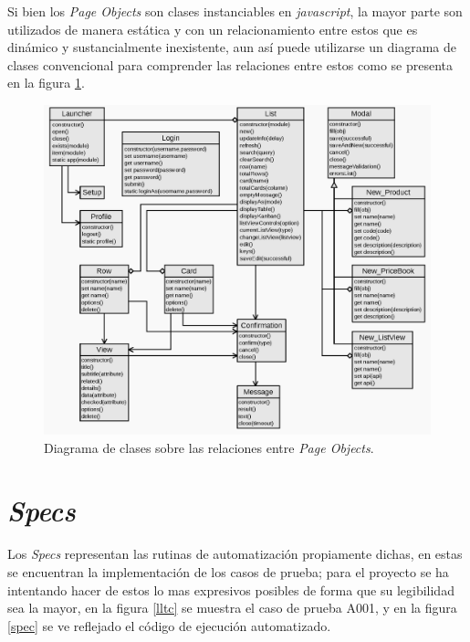 Si bien los \emph{Page Objects} son clases instanciables en \emph{javascript},
la mayor parte son utilizados de manera estática y con un relacionamiento
entre estos que es dinámico y sustancialmente inexistente, aun así puede
utilizarse un diagrama de clases convencional para comprender las relaciones
entre estos como se presenta en la figura \ref{pom}.

\begin{figure}
\centering
\includegraphics[width=1.0\textwidth]{graphics/diagram01.eps}
\caption{Diagrama de clases sobre las relaciones entre \emph{Page Objects}.}
\label{pom}
\end{figure}

\section{\emph{Specs}}
Los \emph{Specs} representan las rutinas de automatización propiamente dichas,
en estas se encuentran la implementación de los casos de prueba; para el
proyecto se ha intentando hacer de estos lo mas expresivos posibles de forma
que su legibilidad sea la mayor, en la figura \ref{lltc} se muestra el caso de
prueba A001, y en la figura \ref{spec} se ve reflejado el código de ejecución
automatizado.

